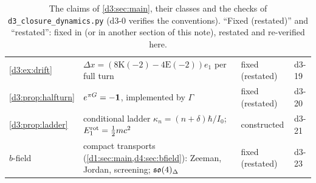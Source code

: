 \begin{table}[t]
\begin{tabular}{@{}>{\raggedright\arraybackslash}p{2.5cm}>{\raggedright\arraybackslash}p{8.3cm}>{\raggedright\arraybackslash}p{2.8cm}>{\raggedright\arraybackslash}p{1.1cm}@{}}
\cref{d3:ex:drift} & $\Delta x=(8\mathrm K(-2)-4\mathrm E(-2))e_1$ per full turn & fixed (restated) & d3-19\\
\cref{d3:prop:halfturn} & $e^{\pi G}=-\mathbf 1$, implemented by $\Gamma$ & fixed (restated) & d3-20\\
\cref{d3:prop:ladder} & conditional ladder $\kappa_n=(n+\delta)\hbar/I_0$; $E^{\rm rot}_1=\tfrac12mc^2$ & constructed & d3-21\\
$b$-field & compact transports (\cref{d1:sec:main,d4:sec:bfield}): Zeeman, Jordan, screening; $\mathfrak{so}(4)_\Delta$ & fixed (restated) & d3-23\\
\bottomrule
\end{tabular}
\caption{The claims of \cref{d3:sec:main}, their classes and the checks of \texttt{d3\_closure\_dynamics.py} (d3-0 verifies the conventions).
``Fixed (restated)'' and ``restated'': fixed in \cite{ES17} (or in another section of this note), restated and re-verified here.}
\label{d3:tab:claims}
\end{table}

